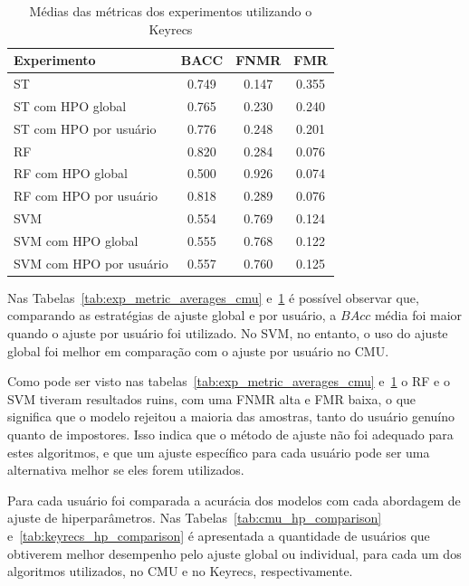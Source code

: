 \begin{table}[htbp]
\centering
\caption{Médias das métricas dos experimentos utilizando o Keyrecs}
\label{tab:exp_metric_averages_keyrecs}
\begin{tabular}{|l|c|c|c|}
\hline
\textbf{Experimento} & \textbf{BACC} & \textbf{FNMR} & \textbf{FMR} \\
\hline
ST & 0.749 & 0.147 & 0.355 \\
\hline
ST com HPO global & 0.765 & 0.230 & 0.240 \\
\hline
ST com HPO por usuário & 0.776 & 0.248 & 0.201 \\
\hline
RF & 0.820 & 0.284 & 0.076 \\
\hline
RF com HPO global & 0.500 & 0.926 & 0.074 \\
\hline
RF com HPO por usuário & 0.818 & 0.289 & 0.076 \\
\hline
SVM & 0.554 & 0.769 & 0.124 \\
\hline
SVM com HPO global & 0.555 & 0.768 & 0.122 \\
\hline
SVM com HPO por usuário & 0.557 & 0.760 & 0.125 \\
\hline
\end{tabular}
\end{table}

Nas Tabelas~\ref{tab:exp_metric_averages_cmu} e~\ref{tab:exp_metric_averages_keyrecs} é possível observar que, comparando as estratégias de ajuste global e por usuário, a $BAcc$ média foi maior quando o ajuste por usuário foi utilizado. No SVM, no entanto, o uso do ajuste global foi melhor em comparação com o ajuste por usuário no CMU.

Como pode ser visto nas tabelas~\ref{tab:exp_metric_averages_cmu} e~\ref{tab:exp_metric_averages_keyrecs} o RF e o SVM tiveram resultados ruins, com uma FNMR alta e FMR baixa, o que significa que o modelo rejeitou a maioria das amostras, tanto do usuário genuíno quanto de impostores. Isso indica que o método de ajuste não foi adequado para estes algoritmos, e que um ajuste específico para cada usuário pode ser uma alternativa melhor se eles forem utilizados.

Para cada usuário foi comparada a acurácia dos modelos com cada abordagem de ajuste de hiperparâmetros. Nas Tabelas~\ref{tab:cmu_hp_comparison} e~\ref{tab:keyrecs_hp_comparison} é apresentada a quantidade de usuários que obtiverem melhor desempenho pelo ajuste global ou individual, para cada um dos algoritmos utilizados, no CMU e no Keyrecs, respectivamente.

